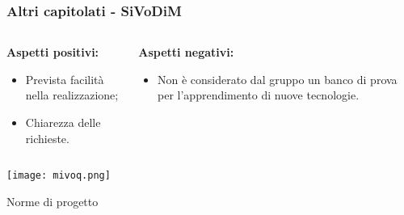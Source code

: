 \begin{frame}
  \frametitle{Altri capitolati - SiVoDiM}
  \begin{columns}
    \begin{column}{0.4\textwidth}
      \par{\textbf{Aspetti positivi:}}
      \begin{itemize}
      \item Prevista facilità nella realizzazione;
      \item Chiarezza delle richieste.
      \end{itemize}
    \end{column}
    \begin{column}{0.4\textwidth}
      \par{\textbf{Aspetti negativi:}}
      \begin{itemize}
      \item Non è considerato dal gruppo un banco di prova per l'apprendimento di nuove tecnologie.
      \end{itemize}
    \end{column}
  \end{columns}
\centering
\texttt{[image: mivoq.png]}
\end{frame}

\begin{frame}

\begin{center}   \huge Norme di progetto \end{center}

\end{frame}

